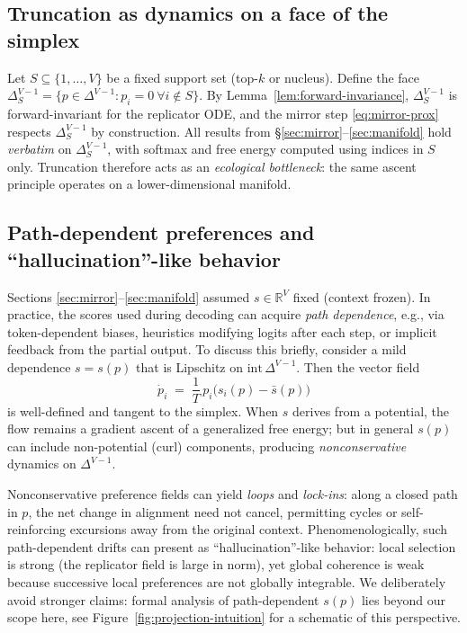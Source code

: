 \documentclass[11pt,reqno]{article}
\numberwithin{equation}{section}
\theoremstyle{plain}
\theoremstyle{definition}
\theoremstyle{remark}
\newcommand{\R}{\mathbb{R}}
\newcommand{\1}{\mathbbm{1}}
\newcommand{\simplex}{\Delta^{V-1}}
\begin{document}
\subsection{Truncation as dynamics on a face of the simplex}\label{subsec:truncation}
Let $S\subseteq\{1,\dots,V\}$ be a fixed support set (top-$k$ or nucleus). Define the face
$\simplex_S=\{p\in\simplex: p_i=0\ \forall i\notin S\}$. By Lemma~\ref{lem:forward-invariance},
$\simplex_S$ is forward-invariant for the replicator ODE, and the mirror step
\eqref{eq:mirror-prox} respects $\simplex_S$ by construction. All results from
\S\ref{sec:mirror}--\ref{sec:manifold} hold \emph{verbatim} on $\simplex_S$, with softmax and free energy
computed using indices in $S$ only. Truncation therefore acts as an \emph{ecological bottleneck}:
the same ascent principle operates on a lower-dimensional manifold.

\subsection{Path-dependent preferences and ``hallucination''-like behavior}\label{subsec:path}
Sections \ref{sec:mirror}--\ref{sec:manifold} assumed $s\in\R^V$ fixed (context frozen). In practice, the
scores used during decoding can acquire \emph{path dependence}, e.g., via token-dependent biases,
heuristics modifying logits after each step, or implicit feedback from the partial output. To discuss
this briefly, consider a mild dependence $s=s(p)$ that is Lipschitz on $\mathrm{int}\,\simplex$.
Then the vector field
\[
\dot p_i \;=\; \frac{1}{T}\,p_i\big(s_i(p) - \bar s(p)\big)
\]
is well-defined and tangent to the simplex. When $s$ derives from a potential, the flow remains
a gradient ascent of a generalized free energy; but in general $s(p)$ can include non-potential (curl)
components, producing \emph{nonconservative} dynamics on $\simplex$.


Nonconservative preference fields can yield \emph{loops} and \emph{lock-ins}: along a closed path in $p$,
the net change in alignment need not cancel, permitting cycles or self-reinforcing excursions away from
the original context. Phenomenologically, such path-dependent drifts can present as ``hallucination''-like
behavior: local selection is strong (the replicator field is large in norm), yet global coherence is weak
because successive local preferences are not globally integrable. We deliberately avoid stronger claims:
formal analysis of path-dependent $s(p)$ lies beyond our scope here, see Figure~\ref{fig:projection-intuition} for a schematic of this perspective. 
\end{document}
